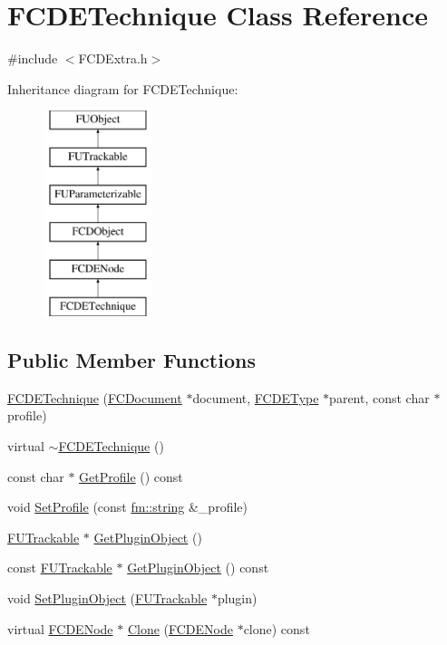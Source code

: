 \hypertarget{classFCDETechnique}{
\section{FCDETechnique Class Reference}
\label{classFCDETechnique}
}


{\ttfamily \#include $<$FCDExtra.h$>$}

Inheritance diagram for FCDETechnique:\begin{figure}[H]
\begin{center}
\leavevmode
\includegraphics[height=6.000000cm]{classFCDETechnique}
\end{center}
\end{figure}
\subsection*{Public Member Functions}
\begin{DoxyCompactItemize}
\item 
\hyperlink{classFCDETechnique_abfb0d834d5ea03d2972429bcaf963016}{FCDETechnique} (\hyperlink{classFCDocument}{FCDocument} $\ast$document, \hyperlink{classFCDEType}{FCDEType} $\ast$parent, const char $\ast$profile)
\item 
virtual \hyperlink{classFCDETechnique_a043feb038171272869fb70f733c7a69c}{$\sim$FCDETechnique} ()
\item 
const char $\ast$ \hyperlink{classFCDETechnique_af70bf2e36a2e43d218d9ef40d84d00c0}{GetProfile} () const 
\item 
void \hyperlink{classFCDETechnique_a39e0252c1e20d496fb4836a5755a1c13}{SetProfile} (const \hyperlink{classfm_1_1stringT}{fm::string} \&\_\-profile)
\item 
\hyperlink{classFUTrackable}{FUTrackable} $\ast$ \hyperlink{classFCDETechnique_afd05d449c901f03a9b687389a10dd510}{GetPluginObject} ()
\item 
const \hyperlink{classFUTrackable}{FUTrackable} $\ast$ \hyperlink{classFCDETechnique_ad5a686c5ebe50025f6bf3c162333818d}{GetPluginObject} () const 
\item 
void \hyperlink{classFCDETechnique_a50db00ed5ed48580f6f613bcb247d6a6}{SetPluginObject} (\hyperlink{classFUTrackable}{FUTrackable} $\ast$plugin)
\item 
virtual \hyperlink{classFCDENode}{FCDENode} $\ast$ \hyperlink{classFCDETechnique_a2bbe271c808cf52f0675cbcbdf520bb8}{Clone} (\hyperlink{classFCDENode}{FCDENode} $\ast$clone) const 
\end{DoxyCompactItemize}


